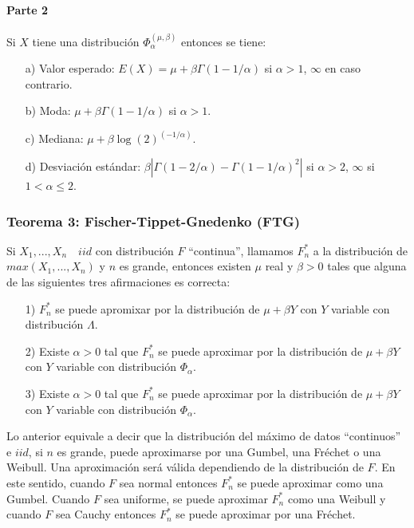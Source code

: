 \documentclass[
  12pt]{article}
\begin{document}
\hypertarget{parte-2-1}{%
\paragraph{Parte 2}\label{parte-2-1}}

Si \(X\) tiene una distribución \(\Phi_{\alpha}^{(\mu, \beta)}\)
entonces se tiene:

\begin{itemize}
  \item[a)] Valor esperado: $E(X) = \mu + \beta\Gamma(1-1/\alpha)$ si $\alpha > 1$, $\infty$ en caso contrario.
  \item[b)] Moda: $\mu + \beta\Gamma(1-1/\alpha)$ si $\alpha>1$.
  \item[c)] Mediana: $\mu + \beta \log(2)^{(-1/\alpha)}$.
  \item[d)] Desviación estándar: $\beta|\Gamma(1-2/\alpha)-\Gamma(1-1/\alpha)^2|$ si $\alpha>2$, $\infty$ si $1<\alpha \leq 2$.
\end{itemize}

\newpage

\hypertarget{teorema-3-fischer-tippet-gnedenko-ftg}{%
\subsubsection{Teorema 3: Fischer-Tippet-Gnedenko
(FTG)}\label{teorema-3-fischer-tippet-gnedenko-ftg}}

Si \(X_1,...,X_n\quad iid\) con distribución \(F\) ``continua'',
llamamos \(F_n^*\) a la distribución de \(max(X_1,...,X_n)\) y \(n\) es
grande, entonces existen \(\mu\) real y \(\beta>0\) tales que alguna de
las siguientes tres afirmaciones es correcta:

\begin{itemize}
  \item[1)] $F_n^*$ se puede apromixar por la distribución de $\mu+\beta Y$ con $Y$ variable con distribución $\Lambda$.
  \item[2)] Existe $\alpha>0$ tal que $F_n^*$ se puede aproximar por la distribución de $\mu+\beta Y$ con $Y$ variable con distribución $\Phi_{\alpha}$. 
  \item[3)] Existe $\alpha>0$ tal que $F_n^*$ se puede aproximar por la distribución de $\mu+\beta Y$ con $Y$ variable con distribución $\Phi_{\alpha}$.
\end{itemize}

Lo anterior equivale a decir que la distribución del máximo de datos
``continuos'' e \(iid\), si \(n\) es grande, puede aproximarse por una
Gumbel, una Fréchet o una Weibull. Una aproximación será válida
dependiendo de la distribución de \(F\). En este sentido, cuando \(F\)
sea normal entonces \(F_n^*\) se puede aproximar como una Gumbel. Cuando
\(F\) sea uniforme, se puede aproximar \(F_n^*\) como una Weibull y
cuando \(F\) sea Cauchy entonces \(F_n^*\) se puede aproximar por una
Fréchet.
\end{document}
